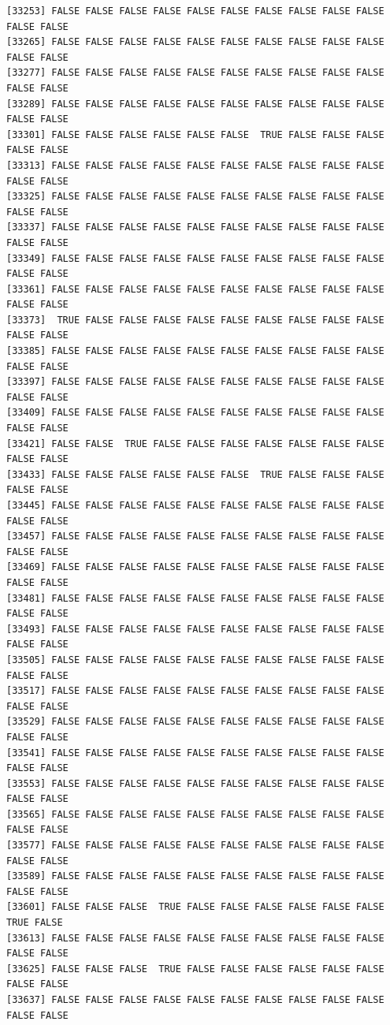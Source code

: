 \documentclass[
  a4paper,
  DIV=11,
  numbers=noendperiod]{scrartcl}
\begin{document}
\begin{verbatim}
[33253] FALSE FALSE FALSE FALSE FALSE FALSE FALSE FALSE FALSE FALSE FALSE FALSE
[33265] FALSE FALSE FALSE FALSE FALSE FALSE FALSE FALSE FALSE FALSE FALSE FALSE
[33277] FALSE FALSE FALSE FALSE FALSE FALSE FALSE FALSE FALSE FALSE FALSE FALSE
[33289] FALSE FALSE FALSE FALSE FALSE FALSE FALSE FALSE FALSE FALSE FALSE FALSE
[33301] FALSE FALSE FALSE FALSE FALSE FALSE  TRUE FALSE FALSE FALSE FALSE FALSE
[33313] FALSE FALSE FALSE FALSE FALSE FALSE FALSE FALSE FALSE FALSE FALSE FALSE
[33325] FALSE FALSE FALSE FALSE FALSE FALSE FALSE FALSE FALSE FALSE FALSE FALSE
[33337] FALSE FALSE FALSE FALSE FALSE FALSE FALSE FALSE FALSE FALSE FALSE FALSE
[33349] FALSE FALSE FALSE FALSE FALSE FALSE FALSE FALSE FALSE FALSE FALSE FALSE
[33361] FALSE FALSE FALSE FALSE FALSE FALSE FALSE FALSE FALSE FALSE FALSE FALSE
[33373]  TRUE FALSE FALSE FALSE FALSE FALSE FALSE FALSE FALSE FALSE FALSE FALSE
[33385] FALSE FALSE FALSE FALSE FALSE FALSE FALSE FALSE FALSE FALSE FALSE FALSE
[33397] FALSE FALSE FALSE FALSE FALSE FALSE FALSE FALSE FALSE FALSE FALSE FALSE
[33409] FALSE FALSE FALSE FALSE FALSE FALSE FALSE FALSE FALSE FALSE FALSE FALSE
[33421] FALSE FALSE  TRUE FALSE FALSE FALSE FALSE FALSE FALSE FALSE FALSE FALSE
[33433] FALSE FALSE FALSE FALSE FALSE FALSE  TRUE FALSE FALSE FALSE FALSE FALSE
[33445] FALSE FALSE FALSE FALSE FALSE FALSE FALSE FALSE FALSE FALSE FALSE FALSE
[33457] FALSE FALSE FALSE FALSE FALSE FALSE FALSE FALSE FALSE FALSE FALSE FALSE
[33469] FALSE FALSE FALSE FALSE FALSE FALSE FALSE FALSE FALSE FALSE FALSE FALSE
[33481] FALSE FALSE FALSE FALSE FALSE FALSE FALSE FALSE FALSE FALSE FALSE FALSE
[33493] FALSE FALSE FALSE FALSE FALSE FALSE FALSE FALSE FALSE FALSE FALSE FALSE
[33505] FALSE FALSE FALSE FALSE FALSE FALSE FALSE FALSE FALSE FALSE FALSE FALSE
[33517] FALSE FALSE FALSE FALSE FALSE FALSE FALSE FALSE FALSE FALSE FALSE FALSE
[33529] FALSE FALSE FALSE FALSE FALSE FALSE FALSE FALSE FALSE FALSE FALSE FALSE
[33541] FALSE FALSE FALSE FALSE FALSE FALSE FALSE FALSE FALSE FALSE FALSE FALSE
[33553] FALSE FALSE FALSE FALSE FALSE FALSE FALSE FALSE FALSE FALSE FALSE FALSE
[33565] FALSE FALSE FALSE FALSE FALSE FALSE FALSE FALSE FALSE FALSE FALSE FALSE
[33577] FALSE FALSE FALSE FALSE FALSE FALSE FALSE FALSE FALSE FALSE FALSE FALSE
[33589] FALSE FALSE FALSE FALSE FALSE FALSE FALSE FALSE FALSE FALSE FALSE FALSE
[33601] FALSE FALSE FALSE  TRUE FALSE FALSE FALSE FALSE FALSE FALSE  TRUE FALSE
[33613] FALSE FALSE FALSE FALSE FALSE FALSE FALSE FALSE FALSE FALSE FALSE FALSE
[33625] FALSE FALSE FALSE  TRUE FALSE FALSE FALSE FALSE FALSE FALSE FALSE FALSE
[33637] FALSE FALSE FALSE FALSE FALSE FALSE FALSE FALSE FALSE FALSE FALSE FALSE

\end{verbatim}
\end{document}
